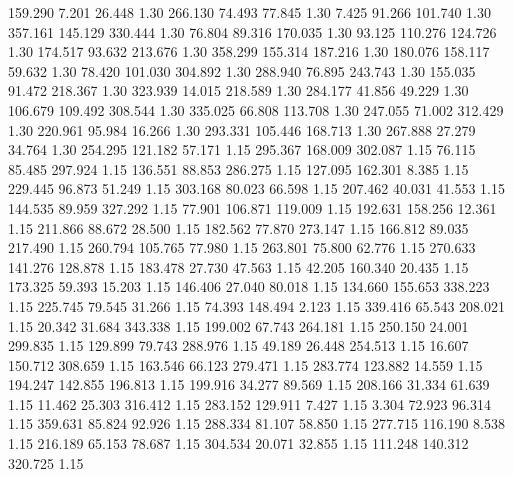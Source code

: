 159.290    7.201   26.448         1.30
 266.130   74.493   77.845         1.30
   7.425   91.266  101.740         1.30
 357.161  145.129  330.444         1.30
  76.804   89.316  170.035         1.30
  93.125  110.276  124.726         1.30
 174.517   93.632  213.676         1.30
 358.299  155.314  187.216         1.30
 180.076  158.117   59.632         1.30
  78.420  101.030  304.892         1.30
 288.940   76.895  243.743         1.30
 155.035   91.472  218.367         1.30
 323.939   14.015  218.589         1.30
 284.177   41.856   49.229         1.30
 106.679  109.492  308.544         1.30
 335.025   66.808  113.708         1.30
 247.055   71.002  312.429         1.30
 220.961   95.984   16.266         1.30
 293.331  105.446  168.713         1.30
 267.888   27.279   34.764         1.30
 254.295  121.182   57.171         1.15
 295.367  168.009  302.087         1.15
  76.115   85.485  297.924         1.15
 136.551   88.853  286.275         1.15
 127.095  162.301    8.385         1.15
 229.445   96.873   51.249         1.15
 303.168   80.023   66.598         1.15
 207.462   40.031   41.553         1.15
 144.535   89.959  327.292         1.15
  77.901  106.871  119.009         1.15
 192.631  158.256   12.361         1.15
 211.866   88.672   28.500         1.15
 182.562   77.870  273.147         1.15
 166.812   89.035  217.490         1.15
 260.794  105.765   77.980         1.15
 263.801   75.800   62.776         1.15
 270.633  141.276  128.878         1.15
 183.478   27.730   47.563         1.15
  42.205  160.340   20.435         1.15
 173.325   59.393   15.203         1.15
 146.406   27.040   80.018         1.15
 134.660  155.653  338.223         1.15
 225.745   79.545   31.266         1.15
  74.393  148.494    2.123         1.15
 339.416   65.543  208.021         1.15
  20.342   31.684  343.338         1.15
 199.002   67.743  264.181         1.15
 250.150   24.001  299.835         1.15
 129.899   79.743  288.976         1.15
  49.189   26.448  254.513         1.15
  16.607  150.712  308.659         1.15
 163.546   66.123  279.471         1.15
 283.774  123.882   14.559         1.15
 194.247  142.855  196.813         1.15
 199.916   34.277   89.569         1.15
 208.166   31.334   61.639         1.15
  11.462   25.303  316.412         1.15
 283.152  129.911    7.427         1.15
   3.304   72.923   96.314         1.15
 359.631   85.824   92.926         1.15
 288.334   81.107   58.850         1.15
 277.715  116.190    8.538         1.15
 216.189   65.153   78.687         1.15
 304.534   20.071   32.855         1.15
 111.248  140.312  320.725         1.15
